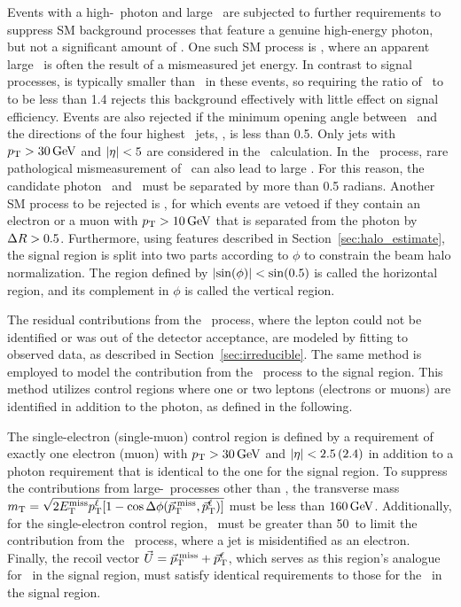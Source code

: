 Events with a high-\pt\ photon and large \met\ are subjected to further requirements to suppress SM background processes that feature a genuine high-energy photon, but not a significant amount of \met.
One such SM process is \gj, where an apparent large \met\ is often the result of a mismeasured jet energy.
In contrast to signal processes, \met is typically smaller than \ETg\ in these events, so requiring the ratio of \ETg\ to \met to be less than 1.4 rejects this background effectively with little effect on signal efficiency. 
Events are also rejected if the minimum opening angle between \ptvecmiss\ and the directions of the four highest \pt\ jets, \mindphijmet, is less than 0.5. 
Only jets with $p_{\mathrm{T}} > 30\,\text{Ge\hspace{-.08em}V}$ and $\lvert \eta \rvert < 5$ are considered in the \mindphijmet\ calculation. 
In the \gj\ process, rare pathological mismeasurement of \ETg\ can also lead to large \met. 
For this reason, the candidate photon \ptvec\ and \ptvecmiss\ must be separated by more than 0.5 radians. 
Another SM process to be rejected is \wlng, for which events are vetoed if they contain an electron or a muon with $p_{\mathrm{T}} > 10\,\text{Ge\hspace{-.08em}V}$ that is separated from the photon by $\Delta R > 0.5$.
Furthermore, using features described in Section~\ref{sec:halo_estimate}, the signal region is split into two parts according to $\phi$ to constrain the beam halo normalization. 
The region defined by $\lvert \sin(\phi) \rvert < \sin(0.5)$ is called the horizontal region, and its complement in $\phi$ is called the vertical region.

The residual contributions from the \wlng\ process, where the lepton could not be identified or was out of the detector acceptance, are modeled by fitting to observed data, as described in Section~\ref{sec:irreducible}. 
The same method is employed to model the contribution from the \zinvg\ process to the signal region. 
This method utilizes control regions where one or two leptons (electrons or muons) are identified in addition to the photon, as defined in the following.

The single-electron (single-muon) control region is defined by a requirement of exactly one electron (muon) with $p_{\mathrm{T}} > 30\,\text{Ge\hspace{-.08em}V}$ and $\lvert \eta \rvert < 2.5\,(2.4)$ in addition to a photon requirement that is identical to the one for the signal region. 
To suppress the contributions from large-\met\ processes other than \wlng, the transverse mass $m_{\mathrm{T}} = \sqrt{\smash[b]{2E_{\mathrm{T}}^{\text{miss}}p_{\mathrm{T}}^{\ell}[1-\cos\Delta\phi({\vec p}_{\mathrm{T}}^{\kern2pt\text{miss}},{\vec p}_{\mathrm{T}}^{\ell})]}}$ must be less than $160\,\text{Ge\hspace{-.08em}V}$.
Additionally, for the single-electron control region, \met\ must be greater than 50\GeV\ to limit the contribution from the \gj\ process, where a jet is misidentified as an electron. 
Finally, the recoil vector $\vec{U} = {\vec p}_{\mathrm{T}}^{\kern2pt\text{miss}} + {\vec p}_{\mathrm{T}}^{\ell}$, which serves as this region's analogue for \ptvecmiss\ in the signal region, must satisfy identical requirements to those for the \ptvecmiss\ in the signal region.

